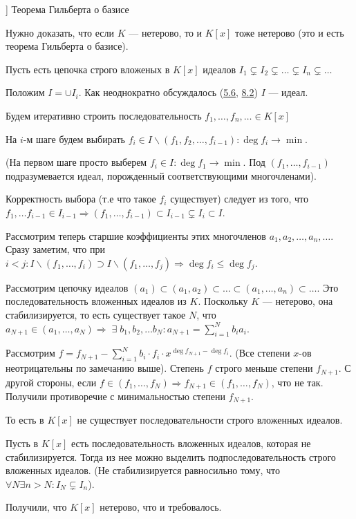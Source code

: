 

\date{}



\begin{problem}[10 [Каргальцев]]
Теорема Гильберта о базисе

Нужно доказать, что если $K$ --- нетерово, то и $K[x]$ тоже нетерово (это и есть теорема Гильберта о базисе).
\end{problem}

Пусть есть цепочка строго вложеных в \(K[x]\) идеалов \(I_1 \subsetneq I_2 \subsetneq \ldots \subsetneq I_n \subsetneq \ldots\)

Положим \(I = \cup I_i\). Как неоднократно обсуждалось (\hyperlink{5.6}{5.6}, \hyperlink{8.2}{8.2}) \(I\) --- идеал.

Будем итеративно строить последовательность \(f_1, \ldots, f_n, \ldots \in K[x]\)

На \(i\)-м шаге будем выбирать \(f_i \in I \backslash (f_1, f_2, \ldots, f_{i - 1}): \deg f_i \to \min\).

(На первом шаге просто выберем \(f_i \in I: \deg f_1 \to \min\). Под \((f_1, \ldots, f_{i - 1})\) подразумевается идеал, порожденный соответствующими многочленами).

Корректность выбора (т.е что такое \(f_i\) существует) следует из того, что \(f_1, \ldots f_{i - 1} \in I_{i - 1} \Rightarrow (f_1, \ldots, f_{i - 1}) \subset I_{i - 1} \subsetneq I_i \subset I\).

Рассмотрим теперь старшие коэффициенты этих многочленов \(a_1, a_2, \ldots, a_n, \ldots\). Сразу заметим, что при \(i < j: I \backslash (f_1, \ldots, f_i) \supset I \backslash (f_1, \ldots, f_j) \Rightarrow \deg f_i \leqslant \deg f_j\).

Рассмотрим цепочку идеалов \((a_1) \subset (a_1, a_2) \subset \ldots \subset (a_1, \ldots, a_n) \subset \ldots\). Это последовательность вложенных идеалов из \(K\). Поскольку \(K\) --- нетерово, она стабилизируется, то есть существует такое \(N\), что \(a_{N + 1} \in (a_1, \ldots, a_N) \Rightarrow \; \exists \; b_1, b_2, \ldots b_N: a_{N + 1} = \sum\limits_{i = 1}^N b_i a_i\).

Рассмотрим \(f = f_{N + 1} - \sum\limits_{i = 1}^N b_i \cdot f_i \cdot x^{\deg f_{N + 1} - \deg f_i}\). (Все степени \(x\)-ов неотрицательны по замечанию выше). Степень \(f\) строго меньше степени \(f_{N + 1}\). С другой стороны, если \(f \in (f_1, \ldots, f_N) \Rightarrow f_{N + 1} \in (f_1, \ldots, f_N)\), что не так. Получили противоречие с минимальностью степени \(f_{N + 1}\).

То есть в \(K[x]\) не существует последовательности строго вложенных идеалов.

Пусть в \(K[x]\) есть последовательность вложенных идеалов, которая не стабилизируется. Тогда из нее можно выделить подпоследовательность строго вложенных идеалов. (Не стабилизируется равносильно тому, что \(\forall N \exists n > N: I_N \subsetneq I_n\)).

Получили, что \(K[x]\) нетерово, что и требовалось.


